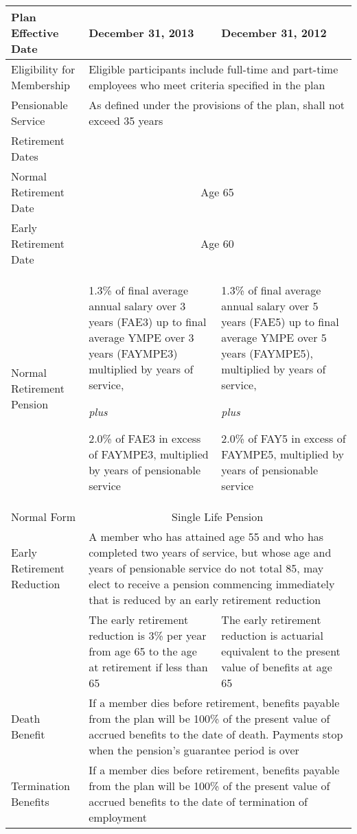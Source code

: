 \documentclass{report}
\begin{document}
\vspace{3mm}
\bgroup
\normalsize
\def\arraystretch{1.5}
\begin{tabular}{p{6cm} p{4.5cm} p{4.5cm}}
\hline
Plan Effective Date & \textbf{December 31, 2013} & \textbf{December 31, 2012} \\ \hline
Eligibility for Membership  &  \multicolumn{2}{p{9cm}}{Eligible participants include full-time and part-time employees who meet criteria specified in the plan} \\  \hline
Pensionable Service & \multicolumn{2}{p{9cm}}{As defined under the provisions of the plan, shall not exceed 35 years} \\ \hline
Retirement Dates \\
\hspace{3mm} Normal Retirement Date & \multicolumn{2}{c}{Age 65}\\ 
\hspace{3mm} Early Retirement Date & \multicolumn{2}{c}{Age 60}\\ \hline
Normal Retirement Pension & 1.3\% of final average annual salary over 3 years (FAE3) up to final average YMPE over 3 years (FAYMPE3) multiplied by years of service,
 
 \vspace{3mm}
\textit{plus}

2.0\% of FAE3 in excess of FAYMPE3, multiplied by years of pensionable service 

& 1.3\% of final average annual salary over 5 years (FAE5) up to final average YMPE over 5 years (FAYMPE5), multiplied by years of service,

 \vspace{3mm}
\textit{plus}

2.0\% of FAY5 in excess of FAYMPE5, multiplied by years of pensionable service \\ \hline
Normal Form & \multicolumn{2}{c}{Single Life Pension} \\ \hline
Early Retirement Reduction & \multicolumn{2}{p{9cm}}{A member who has attained age 55 and who has completed two years of service, but whose age and years of pensionable service do not total 85, may elect to receive a pension commencing immediately that is reduced by an early retirement reduction} \\ 
& The early retirement reduction is 3\% per year from age 65 to the age at retirement if less than 65& The early retirement reduction is actuarial equivalent to the present value of benefits at age 65 \\ \hline
Death Benefit & \multicolumn{2}{p{9cm}}{If a member dies before retirement, benefits payable from the plan will be 100\% of the present value of accrued benefits to the date of death. Payments stop when the pension's guarantee period is over}  \\ \hline
Termination Benefits & \multicolumn{2}{p{9cm}}{If a member dies before retirement, benefits payable from the plan will be 100\% of the present value of accrued benefits to the date of termination of employment} \\ \hline
\end{tabular} 
\egroup


\end{document}
